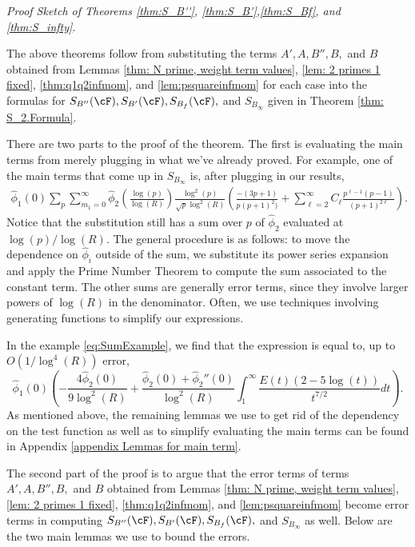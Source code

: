 \documentclass[11pt, reqno]{amsart}
\theoremstyle{definition}
\theoremstyle{remark}
\numberwithin{equation}{section}
\renewcommand{\hat}{\widehat}
\begin{document}
\textit{Proof Sketch of Theorems \ref{thm:S_B''}, \ref{thm:S_B'},\ref{thm:S_Bf}, and \ref{thm:S_infty}.}

The above theorems follow from substituting the terms $A', A, B'', B,$ and $B$ obtained from Lemmas \ref{thm: N prime, weight term values}, \ref{lem: 2 primes 1 fixed}, \ref{thm:q1q2infmom}, and \ref{lem:psquareinfmom} for each case into the formulas for $S_{B''}(\cF), S_{B'}(\cF), S_{B_f}(\cF),$ and $S_{B_\infty}$ given in Theorem \ref{thm: S_2.Formula}.

There are two parts to the proof of the theorem. The first is evaluating the main terms from merely plugging in what we've already proved. For example, one of the main terms that come up in $S_{B_\infty}$ is, after plugging in our results,
\begin{align}\label{eq:SumExample}
    \hat{\phi}_1(0)\sum_{p}\sum_{m_1=0}^{\infty}\hat{\phi}_2\left(\frac{\log(p)}{\log(R)} \right)\frac{\log^2 (p)}{\sqrt{p}\log^2(R)}\left(\frac{-(3p+1)}{p(p+1)^2)}+\sum_{\ell=2}^\infty C_\ell \frac{p^{\ell-1}(p-1)}{(p+1)^{2\ell}}\right).
\end{align}
Notice that the substitution still has a sum over $p$ of   $\hat\phi_2$ evaluated at $\log(p)/\log(R)$. The general procedure is as follows: to move the dependence on $\widehat\phi_i$ outside of the sum, we substitute its power series expansion and apply the Prime Number Theorem to compute the sum associated to the constant term. The other sums are generally error terms, since they involve larger powers of $\log(R)$ in the denominator. Often, we use techniques involving generating functions to simplify our expressions.

In the example \eqref{eq:SumExample}, we find that the expression is equal to, up to $O\left(1/\log^{4}(R)\right)$ error, $$\hat{\phi}_1(0)\left(-\frac{4\hat\phi_2(0)}{9\log^2(R)}+\frac{\hat \phi_2(0)+\hat\phi_2''(0)}{\log^2(R)}\int_1^\infty \frac{E(t)(2-5\log(t))}{t^{7/2}}dt \right).$$
As mentioned above, the remaining lemmas we use to get rid of the dependency on the test function as well as to simplify evaluating the main terms can be found in Appendix \ref{appendix Lemmas for main term}.

The second part of the proof is to argue that the error terms of terms $A', A, B'', B,$ and $B$ obtained from Lemmas \ref{thm: N prime, weight term values}, \ref{lem: 2 primes 1 fixed}, \ref{thm:q1q2infmom}, and \ref{lem:psquareinfmom} become error terms in computing $S_{B''}(\cF), S_{B'}(\cF), S_{B_f}(\cF),$ and $S_{B_\infty}$ as well. Below are the two main lemmas we use to bound the errors.
\end{document}
